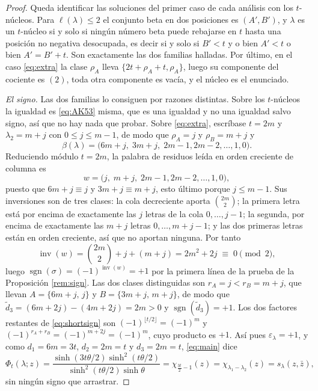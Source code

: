 \documentclass[11pt,reqno]{amsart}
\theoremstyle{plain}
\theoremstyle{definition}
\newcommand{\inv}{\operatorname{inv}}
\newcommand{\sgn}{\operatorname{sgn}}
\newcommand{\zb}{\bar z}
\begin{document}
\begin{proof}
Queda identificar las soluciones del primer caso de cada análisis con los $t$-núcleos. Para
$\ell(\lambda)\le2$ el conjunto beta en dos posiciones es $(A',B')$, y $\lambda$ es un $t$-núcleo si
y solo si ningún número beta puede rebajarse en $t$ hasta una posición no negativa desocupada, es
decir si y solo si $B'<t$ y o bien $A'<t$ o bien $A'=B'+t$. Son exactamente las dos familias
halladas. Por último, en el caso \eqref{eq:extra} la clase $\rho_A$ lleva $\{2t+\rho_A+t,\rho_A\}$,
luego su componente del cociente es $(2)$, toda otra componente es vacía, y el núcleo es el
enunciado.

\emph{El signo.} Las dos familias lo consiguen por razones distintas. Sobre los $t$-núcleos la
igualdad es \eqref{eq:AK53} misma, que es una igualdad y no una igualdad salvo signo, así que no hay
nada que probar. Sobre \eqref{eq:extra}, escríbase $t=2m$ y $\lambda_2=m+j$ con $0\le j\le m-1$, de
modo que $\rho_A=j$ y $\rho_B=m+j$ y
\[
\beta(\lambda)=\bigl(6m+j,\;3m+j,\;2m-1,2m-2,\dots,1,0\bigr).
\]
Reduciendo módulo $t=2m$, la palabra de residuos leída en orden creciente de columna es
\[
w=\bigl(j,\;m+j,\;2m-1,2m-2,\dots,1,0\bigr),
\]
puesto que $6m+j\equiv j$ y $3m+j\equiv m+j$, esto último porque $j\le m-1$. Sus inversiones son de
tres clases: la cola decreciente aporta $\binom{2m}{2}$; la primera letra está por encima de
exactamente las $j$ letras de la cola $0,\dots,j-1$; la segunda, por encima de exactamente las $m+j$
letras $0,\dots,m+j-1$; y las dos primeras letras están en orden creciente, así que no aportan
ninguna. Por tanto
\begin{equation}\label{eq:extrainv}
\inv(w)=\binom{2m}{2}+j+(m+j)=2m^{2}+2j\;\equiv\;0\pmod2 ,
\end{equation}
luego $\sgn(\sigma)=(-1)^{\inv(w)}=+1$ por la primera línea de la prueba de la Proposición
\ref{rem:sign}. Las dos clases distinguidas son $r_A=j<r_B=m+j$, que llevan $A=\{6m+j,\,j\}$ y
$B=\{3m+j,\,m+j\}$, de modo que $\tilde d_3=(6m+2j)-(4m+2j)=2m>0$ y $\sgn(\tilde d_3)=+1$. Los dos
factores restantes de \eqref{eq:shortsign} son $(-1)^{\lfloor t/2\rfloor}=(-1)^{m}$ y
$(-1)^{r_A+r_B}=(-1)^{m+2j}=(-1)^{m}$, cuyo producto es $+1$. Así pues $\varepsilon_\lambda=+1$, y
como $d_1=6m=3t$, $d_2=2m=t$ y $d_3=2m=t$, \eqref{eq:main} dice
\[
\Phi_t(\lambda;z)=\frac{\sinh(3t\theta/2)\sinh^{2}(t\theta/2)}{\sinh^{2}(t\theta/2)\sinh\theta}
=\chi_{\frac{3t}{2}-1}(z)=\chi_{\lambda_1-\lambda_2}(z)=s_\lambda(z,\zb),
\]
sin ningún signo que arrastrar.
\end{proof}
\end{document}
